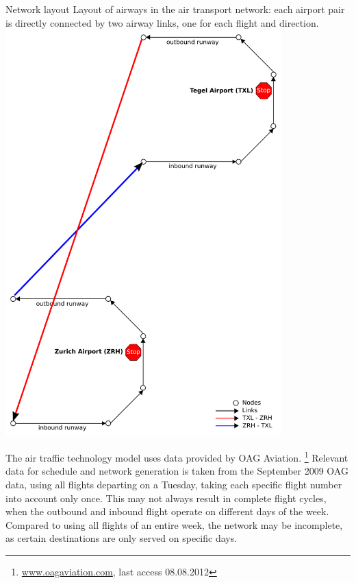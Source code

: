 {\citet{GretherFuerbasNagelFlightTechnology}}
%
%
\createfigure%
{Network layout}%
{Layout of airways in the air transport network: each airport pair is directly connected by two airway links, one for each flight and direction. }%
{\label{fig:air_network_model}}
{\includegraphics[width=0.8\textwidth]{extending/figures/air/sf_airport_network_no_slide.pdf}}%
{\citet{GretherFuerbasNagelFlightTechnology}}

The air traffic technology model uses data provided by OAG  Aviation.%
\footnote{\url{www.oagaviation.com}, last access 08.08.2012}
Relevant data for schedule and network generation is taken from the September 2009 OAG  data, using all flights departing on a Tuesday, taking each specific flight number into account only once.
This may not always result in complete flight cycles, \eg when the outbound and inbound flight operate on different days of the week. 
Compared to using all flights of an entire week, the network may be incomplete, as certain destinations are only served on specific days.

